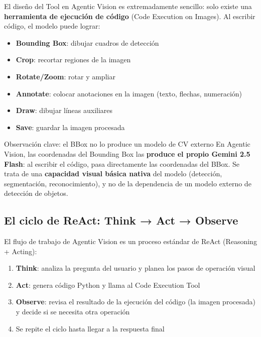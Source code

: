 \documentclass[a4paper]{article}
\begin{document}
El diseño del Tool en Agentic Vision es extremadamente sencillo: solo existe una \textbf{herramienta de ejecución de código} (Code Execution on Images). Al escribir código, el modelo puede lograr:

\begin{itemize}
    \item \textbf{Bounding Box}: dibujar cuadros de detección
    \item \textbf{Crop}: recortar regiones de la imagen
    \item \textbf{Rotate/Zoom}: rotar y ampliar
    \item \textbf{Annotate}: colocar anotaciones en la imagen (texto, flechas, numeración)
    \item \textbf{Draw}: dibujar líneas auxiliares
    \item \textbf{Save}: guardar la imagen procesada
\end{itemize}

\begin{warningbox}{Observación clave: el BBox no lo produce un modelo de CV externo}
En Agentic Vision, las coordenadas del Bounding Box las \textbf{produce el propio Gemini 2.5 Flash}: al escribir el código, pasa directamente las coordenadas del BBox. Se trata de una \textbf{capacidad visual básica nativa} del modelo (detección, segmentación, reconocimiento), y no de la dependencia de un modelo externo de detección de objetos.
\end{warningbox}

\subsection{El ciclo de ReAct: Think → Act → Observe}

El flujo de trabajo de Agentic Vision es un proceso estándar de ReAct (Reasoning + Acting):

\begin{enumerate}
    \item \textbf{Think}: analiza la pregunta del usuario y planea los pasos de operación visual
    \item \textbf{Act}: genera código Python y llama al Code Execution Tool
    \item \textbf{Observe}: revisa el resultado de la ejecución del código (la imagen procesada) y decide si se necesita otra operación
    \item Se repite el ciclo hasta llegar a la respuesta final
\end{enumerate}
\end{document}
